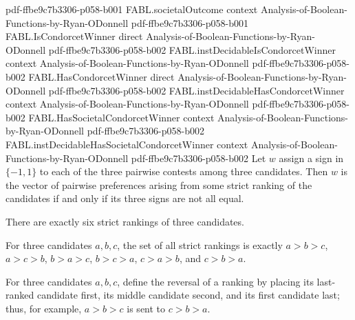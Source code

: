 \begin{theorem}
  {pdf-ffbe9c7b3306-p058-b001}
\proofstep
  {FABL.societalOutcome}
  {context}
  {Analysis-of-Boolean-Functions-by-Ryan-ODonnell}
  {pdf-ffbe9c7b3306-p058-b001}
\proofstep
  {FABL.IsCondorcetWinner}
  {direct}
  {Analysis-of-Boolean-Functions-by-Ryan-ODonnell}
  {pdf-ffbe9c7b3306-p058-b002}
\proofstep
  {FABL.instDecidableIsCondorcetWinner}
  {context}
  {Analysis-of-Boolean-Functions-by-Ryan-ODonnell}
  {pdf-ffbe9c7b3306-p058-b002}
\proofstep
  {FABL.HasCondorcetWinner}
  {direct}
  {Analysis-of-Boolean-Functions-by-Ryan-ODonnell}
  {pdf-ffbe9c7b3306-p058-b002}
\proofstep
  {FABL.instDecidableHasCondorcetWinner}
  {context}
  {Analysis-of-Boolean-Functions-by-Ryan-ODonnell}
  {pdf-ffbe9c7b3306-p058-b002}
\proofstep
  {FABL.HasSocietalCondorcetWinner}
  {context}
  {Analysis-of-Boolean-Functions-by-Ryan-ODonnell}
  {pdf-ffbe9c7b3306-p058-b002}
\proofstep
  {FABL.instDecidableHasSocietalCondorcetWinner}
  {context}
  {Analysis-of-Boolean-Functions-by-Ryan-ODonnell}
  {pdf-ffbe9c7b3306-p058-b002}
Let $w$ assign a sign in $\{-1,1\}$ to each of the three pairwise contests among three
candidates. Then $w$ is the vector of pairwise preferences arising from some strict
ranking of the candidates if and only if its three signs are not all equal.
\end{theorem}

\begin{theorem}
\label{FABL.card_ranking3}
\leanok
{}
There are exactly six strict rankings of three candidates.
\end{theorem}

\begin{theorem}
\label{FABL.univ_ranking3}
\leanok
{}
For three candidates $a,b,c$, the set of all strict rankings is exactly $a>b>c$,
$a>c>b$, $b>a>c$, $b>c>a$, $c>a>b$, and $c>b>a$.
\end{theorem}

\begin{definition}
\label{FABL.reverseRanking}
\leanok
{}
For three candidates $a,b,c$, define the reversal of a ranking by placing its
last-ranked candidate first, its middle candidate second, and its first candidate last;
thus, for example, $a>b>c$ is sent to $c>b>a$.
\end{definition}

